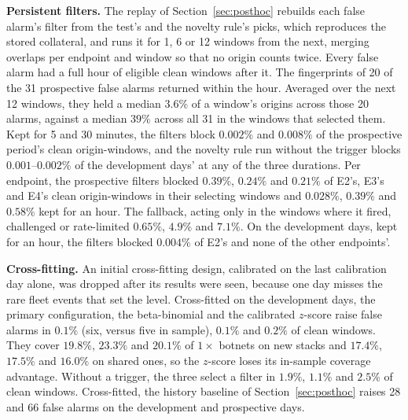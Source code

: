\documentclass[conference,letterpaper,10pt]{IEEEtran}
\newcommand\1{\textit{(i)}}
\newcommand\2{\textit{(ii)}}
\newcommand\3{\textit{(iii)}}
\newcommand\4{\textit{(iv)}}
\newcommand\5{\textit{(v)}}
\newcommand\6{\textit{(vi)}}
\newcommand\7{\textit{(vii)}}
\newcommand\8{\textit{(viii)}}
\newcommand\9{\textit{(ix)}}
\begin{document}
\textbf{Persistent filters.} The replay of Section~\ref{sec:posthoc} rebuilds each false alarm's filter from the test's and the novelty rule's picks, which reproduces the stored collateral, and runs it for 1, 6 or 12 windows from the next, merging overlaps per endpoint and window so that no origin counts twice. Every false alarm had a full hour of eligible clean windows after it. The fingerprints of 20 of the 31 prospective false alarms returned within the hour. Averaged over the next 12 windows, they held a median $3.6\%$ of a window's origins across those 20 alarms, against a median $39\%$ across all 31 in the windows that selected them. Kept for 5 and 30 minutes, the filters block $0.002\%$ and $0.008\%$ of the prospective period's clean origin-windows, and the novelty rule run without the trigger blocks $0.001$--$0.002\%$ of the development days' at any of the three durations. Per endpoint, the prospective filters blocked $0.39\%$, $0.24\%$ and $0.21\%$ of E2's, E3's and E4's clean origin-windows in their selecting windows and $0.028\%$, $0.39\%$ and $0.58\%$ kept for an hour. The fallback, acting only in the windows where it fired, challenged or rate-limited $0.65\%$, $4.9\%$ and $7.1\%$. On the development days, kept for an hour, the filters blocked $0.004\%$ of E2's and none of the other endpoints'.

\textbf{Cross-fitting.} An initial cross-fitting design, calibrated on the last calibration day alone, was dropped after its results were seen, because one day misses the rare fleet events that set the level. Cross-fitted on the development days, the primary configuration, the beta-binomial and the calibrated $z$-score raise false alarms in $0.1\%$ (six, versus five in sample), $0.1\%$ and $0.2\%$ of clean windows. They cover $19.8\%$, $23.3\%$ and $20.1\%$ of $1\times$ botnets on new stacks and $17.4\%$, $17.5\%$ and $16.0\%$ on shared ones, so the $z$-score loses its in-sample coverage advantage. Without a trigger, the three select a filter in $1.9\%$, $1.1\%$ and $2.5\%$ of clean windows. Cross-fitted, the history baseline of Section~\ref{sec:posthoc} raises 28 and 66 false alarms on the development and prospective days.
\end{document}
